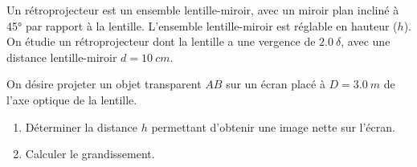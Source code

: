 \documentclass[a4paper, 12pt, final, garamond]{book}
\begin{document}
Un rétroprojecteur est un ensemble lentille-miroir, avec un miroir plan incliné
à \ang{45;;} par rapport à la lentille. L'ensemble lentille-miroir est réglable
en hauteur ($h$). On étudie un rétroprojecteur dont la lentille a une vergence
de $\SI{2.0}{\delta}$, avec une distance lentille-miroir $d = \SI{10}{cm}$. 

On désire projeter un objet transparent $AB$ sur un écran placé à $D =
\SI{3.0}{m}$ de l'axe optique de la lentille.

\begin{enumerate}
    \item Déterminer la distance $h$ permettant d'obtenir une image nette sur
        l'écran.
    \item Calculer le grandissement.
\end{enumerate}
\end{document}
